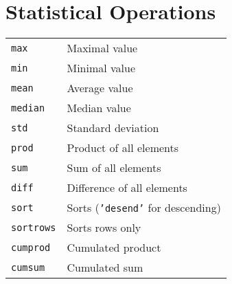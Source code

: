\section{Statistical Operations}
\begin{tabular}{@{}p{\the\MyLenA}%
		@{}p{\linewidth-\the\MyLenA}}
  \texttt{max} & Maximal value\\
  \texttt{min}& Minimal value\\
  \texttt{mean}& Average value\\
  \texttt{median} & Median value\\
  \texttt{std} & Standard deviation\\
  \texttt{prod} & Product of all elements\\
  \texttt{sum} & Sum of all elements\\
  \texttt{diff} & Difference of all elements\\
  \texttt{sort} & Sorts (\texttt{'desend'} for descending)\\
  \texttt{sortrows} & Sorts rows only\\
  \texttt{cumprod} & Cumulated product\\
  \texttt{cumsum} & Cumulated sum\\
\end{tabular}
